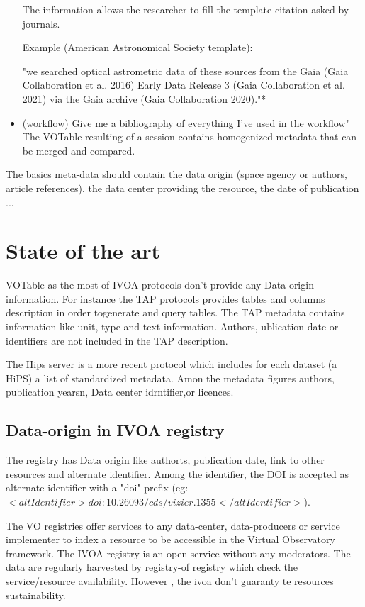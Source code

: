\documentclass[11pt,a4paper]{ivoa}
\begin{document}
\begin{itemize}
	The information allows the researcher to fill the template citation asked by journals.
	
	Example (American Astronomical Society template):
	
	"we searched optical astrometric data of these sources from the Gaia (Gaia Collaboration et al. 2016) Early Data Release 3 (Gaia Collaboration et al. 2021) via the Gaia archive (Gaia Collaboration 2020)."*
	
	\item (workflow) Give me a bibliography of everything I've used in the workflow"
	The VOTable resulting of a session contains homogenized metadata that can be merged and compared.
	
\end{itemize}

The basics meta-data should contain the data origin (space agency or authors, article references), the data center providing the resource, the date of publication ...

\section{State of the art}

VOTable as the most of IVOA protocols don't provide any Data origin information. For instance the TAP protocols provides tables and columns description in order togenerate and query tables. The TAP metadata contains information like unit, type and text information. Authors, ublication date or identifiers are not included in the TAP description.

The Hips server is a more recent protocol which includes for each dataset (a HiPS) a list of standardized metadata. Amon the metadata figures authors, publication yearsn, Data center idrntifier,or licences.


\subsection{Data-origin in IVOA registry}
The registry has Data origin like authorts, publication date, link to other resources and alternate identifier. Among the identifier, the DOI is accepted as alternate-identifier with a "doi" prefix (eg: $<altIdentifier>doi:10.26093/cds/vizier.1355</altIdentifier>$).

The VO registries offer services to any data-center, data-producers or service implementer to index a resource to be accessible in the Virtual Observatory framework. 
The IVOA registry is an open service without any moderators. The data are regularly harvested by registry-of registry which check the service/resource availability. However , the ivoa don't guaranty te resources sustainability.
\end{document}
